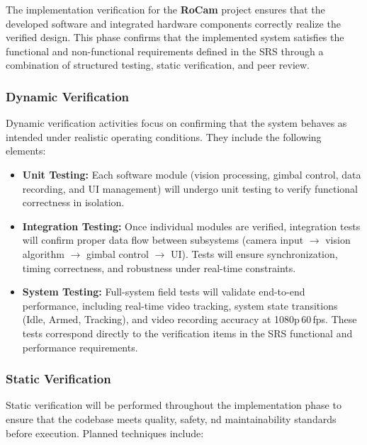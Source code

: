\documentclass[12pt, titlepage]{article}
\begin{document}
The implementation verification for the \textbf{RoCam} project ensures that the
developed software and integrated hardware components correctly realize the
verified design. This phase confirms that the implemented system satisfies the
functional and non-functional requirements defined in the SRS through a
combination of structured testing, static verification, and peer review.

\subsubsection*{Dynamic Verification}
Dynamic verification activities focus on confirming that the system
behaves as intended under realistic operating conditions.
They include the following elements:

\begin{itemize}
  \item \textbf{Unit Testing:}
        Each software module (vision processing, gimbal control, data
        recording, and UI management) will undergo unit testing to verify
        functional correctness in isolation.

  \item \textbf{Integration Testing:}
        Once individual modules are verified, integration tests will
        confirm proper data flow between subsystems (camera input
        $\rightarrow$ vision algorithm $\rightarrow$ gimbal control
        $\rightarrow$ UI).
        Tests will ensure synchronization, timing correctness, and
        robustness under real-time constraints.

  \item \textbf{System Testing:}
        Full-system field tests will validate end-to-end performance,
        including real-time video tracking, system state transitions
        (Idle, Armed, Tracking), and video recording accuracy at 1080p\,60\,fps.
        These tests correspond directly to the verification items in
        the SRS functional and performance requirements.
\end{itemize}

\subsubsection*{Static Verification}
Static verification will be performed throughout the implementation
phase to ensure that the codebase meets quality, safety,
nd maintainability standards before execution.
Planned techniques include:
\end{document}
